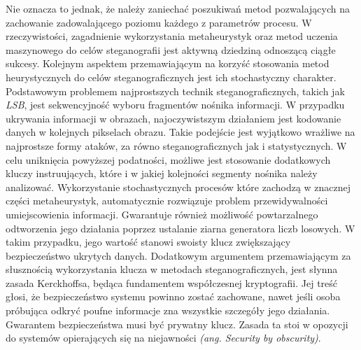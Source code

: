 {    %
    Nie oznacza to jednak, że należy zaniechać poszukiwań metod pozwalających na zachowanie zadowalającego poziomu
    każdego z parametrów procesu. W rzeczywistości, zagadnienie wykorzystania metaheurystyk oraz metod uczenia
    maszynowego do celów steganografii jest aktywną dziedziną odnoszącą ciągłe sukcesy\cite{ElEmam2013NewSA,
    Zhao2021AntCO, Khan2018AntCO, Saleema2016ANS, Li2007ASM}.
    Kolejnym aspektem przemawiającym na korzyść stosowania metod heurystycznych do celów steganograficznych jest ich
    stochastyczny charakter. Podstawowym problemem najprostszych technik steganograficznych, takich jak \textit{LSB},
    jest sekwencyjność wyboru fragmentów nośnika informacji. W przypadku ukrywania informacji w obrazach,
    najoczywistszym działaniem jest kodowanie danych w kolejnych pikselach obrazu. Takie podejście jest wyjątkowo
    wrażliwe na najprostsze formy ataków, za równo steganograficznych jak i statystycznych. W celu uniknięcia powyższej
    podatności, możliwe jest stosowanie dodatkowych kluczy instruujących, które i w jakiej kolejności segmenty nośnika
    należy analizować\cite{AlHusainy2019ASI}. Wykorzystanie stochastycznych procesów które zachodzą w znacznej części
    metaheurystyk, automatycznie rozwiązuje problem przewidywalności umiejscowienia informacji. Gwarantuje również
    możliwość powtarzalnego odtworzenia jego działania poprzez ustalanie ziarna generatora liczb losowych. W takim
    przypadku, jego wartość stanowi swoisty klucz zwiększający bezpieczeństwo ukrytych danych.
    Dodatkowym argumentem przemawiającym za słusznością wykorzystania klucza w metodach steganograficznych, jest słynna
    zasada Kerckhoffsa\cite{Guillot2013AugusteKE}, będąca fundamentem współczesnej kryptografii. Jej treść głosi, że
    bezpieczeństwo systemu powinno zostać zachowane, nawet jeśli osoba próbująca odkryć poufne informacje zna wszystkie
    szczegóły jego działania. Gwarantem bezpieczeństwa musi być prywatny klucz. Zasada ta stoi w opozycji do systemów
    opierających się na niejawności \textit{(ang. Security by obscurity)}.

}
